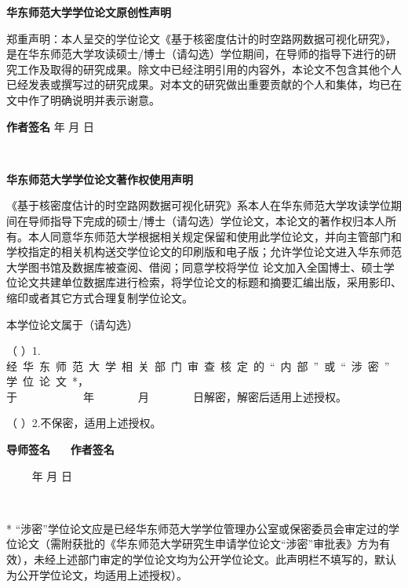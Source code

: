 \newpage
\pagestyle{empty}
\centerline{\fontsize{14pt}{21pt}\selectfont \bf 华东师范大学学位论文原创性声明}

\vspace{-0.1cm}

{
\fontsize{10.5pt}{15.75pt}\selectfont
郑重声明：本人呈交的学位论文《基于核密度估计的时空路网数据可视化研究》，是在华东师范大学攻读硕士/博士（请勾选）学位期间，在导师的指导下进行的研究工作及取得的研究成果。除文中已经注明引用的内容外，本论文不包含其他个人已经发表或撰写过的研究成果。对本文的研究做出重要贡献的个人和集体，均已在文中作了明确说明并表示谢意。
}

{\fontsize{10.5pt}{15.75pt}\selectfont \bf 作者签名}
\qquad \qquad \qquad \qquad \qquad
{\fontsize{10.5pt}{15.75pt}\selectfont {\bf 日期} \qquad 年 \qquad  月 \qquad  日}

\ \\

\vspace{0.2cm}

\centerline{\fontsize{14pt}{21pt}\selectfont \bf 华东师范大学学位论文著作权使用声明}

\vspace{0.2cm}

{
\fontsize{10.5pt}{18pt}\selectfont
《基于核密度估计的时空路网数据可视化研究》系本人在华东师范大学攻读学位期间在导师指导下完成的硕士/博士（请勾选）学位论文，本论文的著作权归本人所有。本人同意华东师范大学根据相关规定保留和使用此学位论文，并向主管部门和学校指定的相关机构送交学位论文的印刷版和电子版；允许学位论文进入华东师范大学图书馆及数据库被查阅、借阅；同意学校将学位
论文加入全国博士、硕士学位论文共建单位数据库进行检索，将学位论文的标题和摘要汇编出版，采用影印、缩印或者其它方式合理复制学位论文。

\vspace{0.3cm}
\fontsize{10.5pt}{18pt}\selectfont
本学位论文属于（请勾选）


（ \qquad ）1.经~华~东~师~范~大~学~相~关~部~门~审~查~核~定~的~“~内~部~”~或~“~涉~密~”~学~位~论~文~*，\\
于~~~~~~~~~~~~年~~~~~~~~月~~~~~~~~日解密，解密后适用上述授权。

（ \qquad ）2.不保密，适用上述授权。

\vspace{0.2cm}

{\fontsize{10.5pt}{15.75pt}\selectfont \bf 导师签名}
\qquad \qquad \qquad \qquad \qquad \qquad \qquad \ \ \
{\fontsize{10.5pt}{15.75pt}\selectfont \bf 作者签名}

\qquad \qquad \qquad \qquad \qquad \qquad \qquad \qquad \qquad \ \ \ \ 
{\fontsize{10.5pt}{15.75pt}\selectfont {\bf 日期} \qquad 年 \qquad  月 \qquad  日}

}

\ \\

\vspace{-0.7cm}

{
\fontsize{10pt}{15pt}\selectfont
* “涉密”学位论文应是已经华东师范大学学位管理办公室或保密委员会审定过的学位论文（需附获批的《华东师范大学研究生申请学位论文“涉密”审批表》方为有效），未经上述部门审定的学位论文均为公开学位论文。此声明栏不填写的，默认为公开学位论文，均适用上述授权）。
}


\cleardoublepage